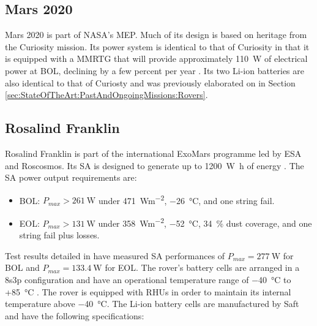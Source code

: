 \subsection{Mars 2020}
\label{sec:StateOfTheArt:PlannedMissions:Mars2020}

Mars 2020 is part of \ac{NASA}'s \ac{MEP}. Much of its design is based on heritage from the Curiosity mission. Its power system is identical to that of Curiosity in that it is equipped with a \ac{MMRTG} that will provide approximately \SI{110}{\watt} of electrical power at \ac{BOL}, declining by a few percent per year . Its two \ac{Li-ion} batteries are also identical to that of Curiosty and was previously elaborated on in Section \ref{sec:StateOfTheArt:PastAndOngoingMissions:Rovers}.

\subsection{Rosalind Franklin}
\label{sec:StateOfTheArt:PlannedMissions:RosalindFranklin}

Rosalind Franklin is part of the international ExoMars programme led by \ac{ESA} and Roscosmos. Its \ac{SA} is designed to generate up to \SI{1200}{\watt\hour} of energy . The \ac{SA} power output requirements are:

\begin{itemize}
    \item \ac{BOL}: $P_{max} > \SI{261}{\watt}$ under \SI{471}{Wm^{-2}}, \SI{-26}{\celsius}, and one string fail.
    \item \ac{EOL}: $P_{max} > \SI{131}{\watt}$ under \SI{358}{Wm^{-2}}, \SI{-52}{\celsius}, \SI{34}{\percent} dust coverage, and one string fail plus losses.
\end{itemize}

Test results detailed in  have measured \ac{SA} performances of $P_{max} = \SI{277}{\watt}$ for \ac{BOL} and $P_{max} = \SI{133.4}{\watt}$ for \ac{EOL}. The rover's battery cells are arranged in a 8s3p configuration and have an operational temperature range of \SI{-40}{\celsius} to +\SI{85}{\celsius} . The rover is equipped with \acp{RHU} in order to maintain its internal temperature above \SI{-40}{\celsius}. The \ac{Li-ion} battery cells are manufactured by Saft and have the following specifications:

